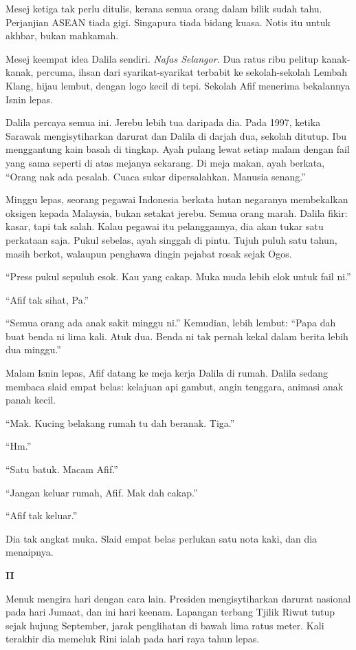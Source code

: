 \documentclass[
  11pt,
  a5paper,
  openany,
  oneside]{book}
\begin{document}
Mesej ketiga tak perlu ditulis, kerana semua orang dalam bilik sudah
tahu. Perjanjian ASEAN tiada gigi. Singapura tiada bidang kuasa. Notis
itu untuk akhbar, bukan mahkamah.

Mesej keempat idea Dalila sendiri. \emph{Nafas Selangor.} Dua ratus ribu
pelitup kanak-kanak, percuma, ihsan dari syarikat-syarikat terbabit ke
sekolah-sekolah Lembah Klang, hijau lembut, dengan logo kecil di tepi.
Sekolah Afif menerima bekalannya Isnin lepas.

Dalila percaya semua ini. Jerebu lebih tua daripada dia. Pada 1997,
ketika Sarawak mengisytiharkan darurat dan Dalila di darjah dua, sekolah
ditutup. Ibu menggantung kain basah di tingkap. Ayah pulang lewat setiap
malam dengan fail yang sama seperti di atas mejanya sekarang. Di meja
makan, ayah berkata, ``Orang nak ada pesalah. Cuaca sukar dipersalahkan.
Manusia senang.''

Minggu lepas, seorang pegawai Indonesia berkata hutan negaranya
membekalkan oksigen kepada Malaysia, bukan setakat jerebu. Semua orang
marah. Dalila fikir: kasar, tapi tak salah. Kalau pegawai itu
pelanggannya, dia akan tukar satu perkataan saja. Pukul sebelas, ayah
singgah di pintu. Tujuh puluh satu tahun, masih berkot, walaupun
penghawa dingin pejabat rosak sejak Ogos.

``Press pukul sepuluh esok. Kau yang cakap. Muka muda lebih elok untuk
fail ni.''

``Afif tak sihat, Pa.''

``Semua orang ada anak sakit minggu ni.'' Kemudian, lebih lembut: ``Papa
dah buat benda ni lima kali. Atuk dua. Benda ni tak pernah kekal dalam
berita lebih dua minggu.''

Malam Isnin lepas, Afif datang ke meja kerja Dalila di rumah. Dalila
sedang membaca slaid empat belas: kelajuan api gambut, angin tenggara,
animasi anak panah kecil.

``Mak. Kucing belakang rumah tu dah beranak. Tiga.''

``Hm.''

``Satu batuk. Macam Afif.''

``Jangan keluar rumah, Afif. Mak dah cakap.''

``Afif tak keluar.''

Dia tak angkat muka. Slaid empat belas perlukan satu nota kaki, dan dia
menaipnya.

\textbf{II}

Menuk mengira hari dengan cara lain. Presiden mengisytiharkan darurat
nasional pada hari Jumaat, dan ini hari keenam. Lapangan terbang Tjilik
Riwut tutup sejak hujung September, jarak penglihatan di bawah lima
ratus meter. Kali terakhir dia memeluk Rini ialah pada hari raya tahun
lepas.
\end{document}
